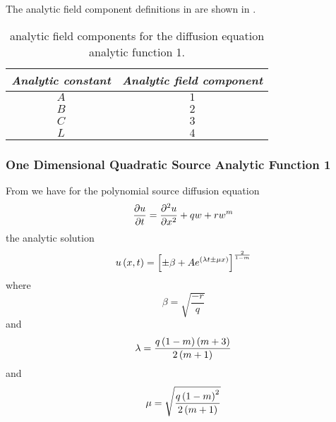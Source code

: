 The analytic field component definitions in \OpenCMISS are shown in .

\begin{table}[htb] \centering
  \begin{tabular}{|c|c|} \hline
    \emph{Analytic constant} & \emph{Analytic field component} \\ \hline \hline
    $A$ & $1$ \\ 
    $B$ & $2$ \\
    $C$ & $3$ \\
    $L$ & $4$ \\ \hline
  \end{tabular}
  \caption{\OpenCMISS analytic field components for the \oned diffusion equation
    analytic function 1.}
  \label{tab:OpenCMISSAnalyticFieldDiffusionEquationOneDim1}
\end{table}

\subsubsection{One Dimensional Quadratic Source Analytic Function 1}

From  we have for
the \oned polynomial source diffusion equation
\begin{equation}
   \dfrac{\partial u}{\partial t} = \dfrac{\partial^{2} u}{\partial {x}^{2}} +qw+rw^{m}
\end{equation}
the analytic solution
\begin{equation}
   u\left( x,t \right) =\left[ \pm\beta+Ae^{\left( \lambda t \pm\mu x \right)} \right]^\frac{2}{1-m}
\end{equation}
where
\begin{equation}
  \beta=\sqrt{\dfrac{-r}{q}}
\end{equation}
and
\begin{equation}
  \lambda=\dfrac{q\left( 1-m \right)\left( m+3 \right)}{2\left( m+1 \right)}
\end{equation}
and 
\begin{equation}
  \mu=\sqrt{\dfrac{q\left( 1-m \right)^{2}}{2\left( m+1 \right)}}
\end{equation}

